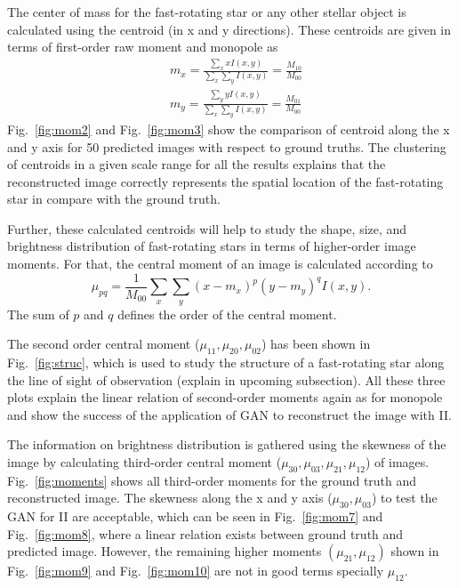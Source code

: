 The center of mass for the fast-rotating star or any other stellar object is calculated using the centroid (in x and y directions). These centroids are given in terms of first-order raw moment and monopole as
\begin{equation}
	\begin{aligned}
		&m_x = \frac{\sum_{x} x I(x,y)}{\sum_{x} \sum_{y} I(x, y)} = \frac{M_{10}}{M_{00}} \\
		&m_y = \frac{\sum_{y} y I(x,y)}{\sum_{x} \sum_{y} I(x, y)} = \frac{M_{01}}{M_{00}}
	\end{aligned}  
\end{equation}
Fig.~\ref{fig:mom2} and Fig.~\ref{fig:mom3} show the comparison of centroid along the x and y axis for 50 predicted images with respect to ground truths. The clustering of centroids in a given scale range for all the results explains that the reconstructed image correctly represents the spatial location of the fast-rotating star in compare with the ground truth.

Further, these calculated centroids will help to study the shape, size, and brightness distribution of fast-rotating stars in terms of higher-order image moments. For that, the central moment of an image is calculated according to
\begin{equation}
	\mu_{pq} = \frac{1}{M_{00}}\sum_{x} \sum_{y} (x - m_x)^p (y - m_y)^q I(x, y).
\end{equation}
The sum of $p$ and $q$ defines the order of the central moment.

The second order central moment ($\mu_{11}, \mu_{20}, \mu_{02}$) has been shown in Fig.~\ref{fig:struc}, which is used to study the structure of a fast-rotating star along the line of sight of observation (explain in upcoming subsection). All these three plots explain the linear relation of second-order moments again as for monopole and show the success of the application of GAN to reconstruct the image with II.

The information on brightness distribution is gathered using the skewness of the image by calculating third-order central moment ($\mu_{30}, \mu_{03}, \mu_{21}, \mu_{12}$) of images. Fig.~\ref{fig:moments} shows all third-order moments for the ground truth and reconstructed image. The skewness along the x and y axis ($\mu_{30}, \mu_{03}$) to test the GAN for II are acceptable, which can be seen in Fig.~\ref{fig:mom7} and Fig.~\ref{fig:mom8}, where a linear relation exists between ground truth and predicted image. However, the remaining higher moments $(\mu_{21}, \mu_{12})$ shown in Fig.~\ref{fig:mom9} and Fig.~\ref{fig:mom10} are not in good terms specially $\mu_{12}$.

